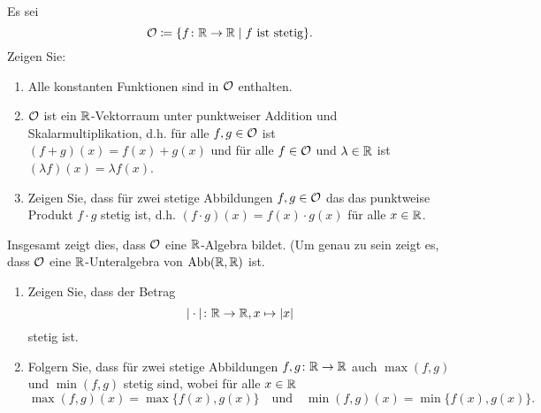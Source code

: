 \documentclass[a4paper,10pt]{article}
\begin{document}
\begin{question}
 Es sei
 \[
  \mathcal{O} \coloneqq \{f \colon \mathbb{R} \to \mathbb{R} \mid \text{$f$ ist stetig}\}.
 \]
 Zeigen Sie:
 \begin{enumerate}
  \item
   Alle konstanten Funktionen sind in $\mathcal{O}$ enthalten.
  \item
   $\mathcal{O}$ ist ein $\mathbb{R}$-Vektorraum unter punktweiser Addition und Skalarmultiplikation, d.h. für alle $f, g \in \mathcal{O}$ ist $(f+g)(x) = f(x)+g(x)$ und für alle $f \in \mathcal{O}$ und $\lambda \in \mathbb{R}$ ist $(\lambda f)(x) = \lambda f(x)$.
  \item
   Zeigen Sie, dass für zwei stetige Abbildungen $f, g \in \mathcal{O}$ das das punktweise Produkt $f \cdot g$ stetig ist, d.h. $(f \cdot g)(x) = f(x) \cdot g(x)$ für alle $x \in \mathbb{R}$.
 \end{enumerate}
 Insgesamt zeigt dies, dass $\mathcal{O}$ eine $\mathbb{R}$-Algebra bildet. (Um genau zu sein zeigt es, dass $\mathcal{O}$ eine $\mathbb{R}$-Unteralgebra von $\operatorname{Abb}(\mathbb{R}, \mathbb{R})$ ist.
\end{question}



\begin{question}
 \begin{enumerate}
  \item
   Zeigen Sie, dass der Betrag
   \[
    |\cdot| \colon \mathbb{R} \to \mathbb{R}, x \mapsto |x|
   \]
   stetig ist.
  \item
   Folgern Sie, dass für zwei stetige Abbildungen $f, g \colon \mathbb{R} \to \mathbb{R}$ auch $\max(f,g)$ und $\min(f,g)$ stetig sind, wobei für alle $x \in \mathbb{R}$
   \[
    \max(f,g)(x) = \max\{f(x),g(x)\}
    \quad
    \text{und}
    \quad
    \min(f,g)(x) = \min\{f(x),g(x)\}.
   \]
 \end{enumerate}
\end{question}
\end{document}
